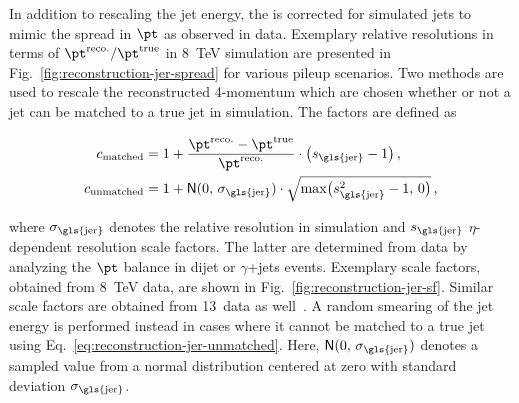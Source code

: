 In addition to rescaling the jet energy, the  is corrected for simulated jets to mimic the spread in $\pt$ as observed in data. Exemplary relative resolutions in terms of $\pt^\mathrm{reco.}/\pt^\mathrm{true}$ in 8~TeV simulation are presented in Fig.~\ref{fig:reconstruction-jer-spread} for various pileup scenarios. Two methods are used to rescale the reconstructed 4-momentum which are chosen whether or not a jet can be matched to a true jet in simulation. The factors are defined as

\begin{subequations}
\begin{align}
c_\mathrm{matched}&=1+\frac{\pt^\mathrm{reco.}-\pt^\mathrm{true}}{\pt^\mathrm{reco.}}\cdot\big(s_\mathrm{\gls{jer}}-1\big)\,,\label{eq:reconstruction-jer-matched}\\ c_\mathrm{unmatched}&=1+\mathsf{N}(0,\,\sigma_\mathrm{\gls{jer}})\cdot\sqrt{\mathrm{max}\big(s_\mathrm{\gls{jer}}^2-1,\,0\big)}\,,\label{eq:reconstruction-jer-unmatched}
\end{align}
\end{subequations}

where $\sigma_\mathrm{\gls{jer}}$ denotes the relative resolution in simulation and  $s_\mathrm{\gls{jer}}$ $\eta$-dependent resolution scale factors. The latter are determined from data by analyzing the $\pt$ balance in dijet or \mbox{$\gamma$+jets} events. Exemplary scale factors, obtained from 8~TeV data, are shown in Fig.~\ref{fig:reconstruction-jer-sf}. Similar scale factors are obtained from 13~\TeV data as well~\cite{CMS-DP-2016-020}. A random smearing of the jet energy is performed instead in cases where it cannot be matched to a true jet using Eq.~\ref{eq:reconstruction-jer-unmatched}. Here, $\mathsf{N}(0,\,\sigma_\mathrm{\gls{jer}})$ denotes a sampled value from a normal distribution centered at zero with standard deviation $\sigma_\mathrm{\gls{jer}}$.

